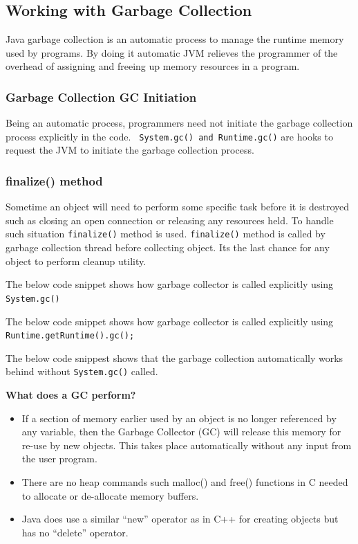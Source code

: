 \documentclass[11pt,a4paper]{article}
\begin{document}
\subsection*{Working with Garbage Collection}
Java garbage collection is an automatic process to manage the runtime memory used by programs. By doing it automatic JVM relieves the programmer of the overhead of assigning and freeing up memory resources in a program.

\subsubsection*{Garbage Collection GC Initiation}
Being an automatic process, programmers need not initiate the garbage collection process explicitly in the code. \lstinline! System.gc() and Runtime.gc()! are hooks to request the JVM to initiate the garbage collection process.
\subsubsection*{finalize() method}
Sometime an object will need to perform some specific task before it is destroyed such as closing an open connection or releasing any resources held. To handle such situation \lstinline!finalize()! method is used. \lstinline!finalize()! method is called by garbage collection thread before collecting object. Its the last chance for any object to perform cleanup utility.

The below code snippet shows how garbage collector is called explicitly using \lstinline!System.gc()!


The below code snippet shows how garbage collector is called explicitly using \lstinline!Runtime.getRuntime().gc();!

The below code snippest shows that the garbage collection automatically works behind without \lstinline!System.gc()! called.


\textbf{What does a GC perform?}
\begin{itemize}
 \item If a section of memory earlier used by an object is no longer referenced by any variable, then the Garbage Collector (GC) will release this memory for re-use by new objects. This takes place automatically without any input from the user program.
 \item There are no heap commands such malloc() and free() functions in C needed to allocate or de-allocate memory buffers.
 \item Java does use a similar ``new'' operator as in C++ for creating objects but has no ``delete'' operator.
\end{itemize}
\end{document}
